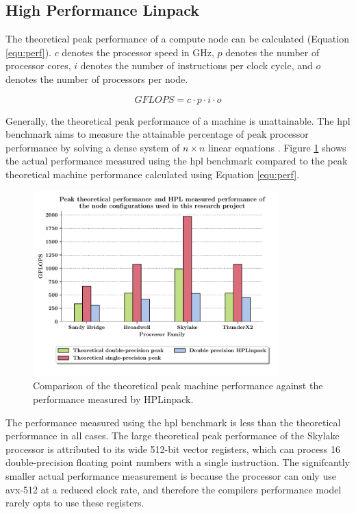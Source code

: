 \documentclass[a4paper,11pt]{report}
\begin{document}
\subsection{High Performance Linpack}
The theoretical peak performance of a compute node can be calculated (Equation \ref{equ:perf}). $c$ denotes the processor speed in GHz, $p$ denotes the number of processor cores, $i$ denotes the number of instructions per clock cycle, and $o$ denotes the number of processors per node. 

\begin{equation}
GFLOPS = c \cdot p \cdot i \cdot o 
\label{equ:perf}
\end{equation}
\par
Generally, the theoretical peak performance of a machine is unattainable. The \gls{hpl} benchmark aims to measure the attainable percentage of peak processor performance by solving a dense system of $n\times n$ linear equations \cite{dongarra2008linpack}. Figure \ref{fig:hpl} shows the actual performance measured using the \gls{hpl} benchmark compared to the peak theoretical machine performance calculated using Equation \ref{equ:perf}. 
\par
\begin{figure}[htbp]
\begin{center}
\includegraphics[width=0.85\textwidth]{img/hpl.pdf}
\caption[High performance Linpack benchmark]{Comparison of the theoretical peak machine performance against the performance measured by HPLinpack. }
\label{fig:hpl}
\end{center}
\end{figure}
\par
The performance measured using the \gls{hpl} benchmark is less than the theoretical performance in all cases. The large theoretical peak performance of the Skylake processor is attributed to its wide 512-bit vector registers, which can process 16 double-precision floating point numbers with a single instruction. The signifcantly smaller actual performance measurement is because the processor can only use \gls{avx}-512 at a reduced clock rate, and therefore the compilers performance model rarely opts to use these registers. 
\end{document}
